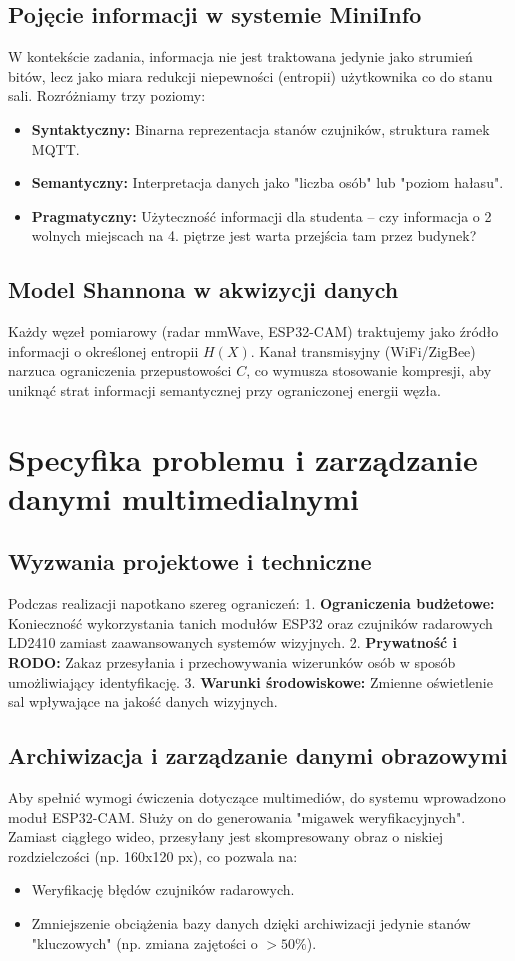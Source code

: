 \documentclass[12pt,a4paper]{article}
\begin{document}
\subsection{Pojęcie informacji w systemie MiniInfo}
W kontekście zadania, informacja nie jest traktowana jedynie jako strumień bitów, lecz jako miara redukcji niepewności (entropii) użytkownika co do stanu sali. Rozróżniamy trzy poziomy:
\begin{itemize}
    \item \textbf{Syntaktyczny:} Binarna reprezentacja stanów czujników, struktura ramek MQTT.
    \item \textbf{Semantyczny:} Interpretacja danych jako "liczba osób" lub "poziom hałasu".
    \item \textbf{Pragmatyczny:} Użyteczność informacji dla studenta – czy informacja o 2 wolnych miejscach na 4. piętrze jest warta przejścia tam przez budynek?
\end{itemize}

\subsection{Model Shannona w akwizycji danych}
Każdy węzeł pomiarowy (radar mmWave, ESP32-CAM) traktujemy jako źródło informacji o określonej entropii $H(X)$. Kanał transmisyjny (WiFi/ZigBee) narzuca ograniczenia przepustowości $C$, co wymusza stosowanie kompresji, aby uniknąć strat informacji semantycznej przy ograniczonej energii węzła.

\section{Specyfika problemu i zarządzanie danymi multimedialnymi}
\subsection{Wyzwania projektowe i techniczne}
Podczas realizacji napotkano szereg ograniczeń:
1. \textbf{Ograniczenia budżetowe:} Konieczność wykorzystania tanich modułów ESP32 oraz czujników radarowych LD2410 zamiast zaawansowanych systemów wizyjnych.
2. \textbf{Prywatność i RODO:} Zakaz przesyłania i przechowywania wizerunków osób w sposób umożliwiający identyfikację.
3. \textbf{Warunki środowiskowe:} Zmienne oświetlenie sal wpływające na jakość danych wizyjnych.

\subsection{Archiwizacja i zarządzanie danymi obrazowymi}
Aby spełnić wymogi ćwiczenia dotyczące multimediów, do systemu wprowadzono moduł ESP32-CAM. Służy on do generowania "migawek weryfikacyjnych". Zamiast ciągłego wideo, przesyłany jest skompresowany obraz o niskiej rozdzielczości (np. 160x120 px), co pozwala na:
\begin{itemize}
    \item Weryfikację błędów czujników radarowych.
    \item Zmniejszenie obciążenia bazy danych dzięki archiwizacji jedynie stanów "kluczowych" (np. zmiana zajętości o $>50\%$).
\end{itemize}
\end{document}
